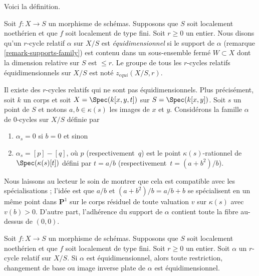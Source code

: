 \noindent
 Voici la définition. 

\begin{definition} 
\label{definition-equidimensional} 
Soit  $f : X \to S$  un morphisme de schémas. Supposons que  $S$  soit localement noethérien et
 que  $f$  soit localement de type fini. Soit $r \geq 0$  un entier. Nous disons
 qu'un  $r$-cycle relatif  $\alpha$ sur  $X/S$  est {\it équidimensionnel} si le support 
de  $\alpha$  (remarque \ref{remark-supports-family}) est
 contenu dans un sous-ensemble fermé  $W \subset X$  dont la dimension
 relative sur  $S$  est  $\leq r$.
 Le groupe de tous les  $r$-cycles relatifs équidimensionnels sur $X/S$  
est noté  $z_{equi}(X/S, r)$. 
\end{definition} 

\begin{example} 
\label{example-not-equidimensional} 
\begin{reference} 
\cite[exemple 3.1.9]{SV} 
\end{reference}
 Il existe des  $r$-cycles relatifs qui ne sont pas équidimensionnels. Plus 
précisément, soit  $k$  un corps et soit  $X = \Spec(k[x, y, t])$
  sur  $S = \Spec(k[x, y])$. Soit $s$  un point de  $S$  et 
notons  $a, b \in \kappa(s)$  les images de $x$  et  $y$.
 Considérons la famille  $\alpha$  de $0$-cycles sur  $X/S$  définie par 
\begin{enumerate} 
\item $\alpha_s = 0$  si  $b = 0$  et sinon 
\item $\alpha_s = [p] - [q]$, où  $p$ (respectivement\ $q$) est le point $\kappa(s)$-rationnel
 de  $\Spec(\kappa(s)[t])$  défini par  $t = a/b$ 
(respectivement\ $t = (a + b^2)/b$). 
\end{enumerate} 
Nous laissons au lecteur le soin de montrer que cela est compatible avec les spécialisations
 ; l'idée est que  $a/b$  et  $(a + b^2)/b = a/b + b$  se spécialisent en un même point 
dans  $\mathbf{P}^1$  sur le corps résiduel de toute valuation  $v$  sur $\kappa(s)$
  avec  $v(b) > 0$. D'autre part, l'adhérence du support de $\alpha$
  contient toute la fibre au-dessus de  $(0, 0)$. 
\end{example} 

\begin{lemma} 
\label{lemma-equidimensional-functoriality} 
Soit  $f : X \to S$  un morphisme de schémas. Supposons que  $S$  soit localement noethérien et
 que  $f$  soit localement de type fini. Soit $r \geq 0$  un entier. Soit  
$\alpha$  un  $r$-cycle relatif sur $X/S$. Si  $\alpha$  est équidimensionnel, 
alors toute restriction, changement de base ou image inverse plate de  $\alpha$  est
 équidimensionnel. 
\end{lemma} 

